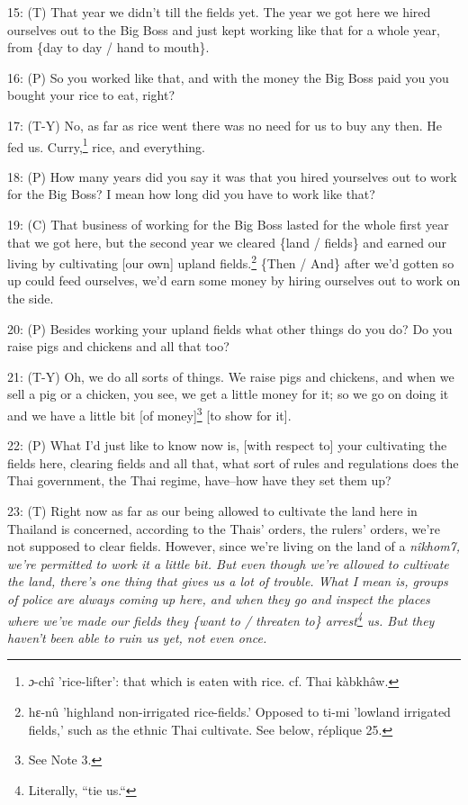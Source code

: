 15: (T) That year we didn't till the fields yet. The year we got here we hired
ourselves out to the Big Boss and just kept working like that for a whole year,
from \{day to day / hand to mouth\}.

16: (P) So you worked like that, and with the money the Big Boss paid you you bought
your rice to eat, right?

17: (T-Y) No, as far as rice went there was no need for us to buy any then. He
fed us. Curry,\footnote{\emph{ɔ}-chî 'rice-lifter': that which is eaten with rice. cf. Thai kàbkhâw.} rice, and everything.

18: (P) How many years did you say it was that you hired yourselves out to work
for the Big Boss? I mean how long did you have to work like that?

19: (C) That business of working for the Big Boss lasted for the whole first year
that we got here, but the second year we cleared \{land / fields\} and earned our
living by cultivating [our own] upland fields.\footnote{hɛ-nû 'highland non-irrigated rice-fields.' Opposed to ti-mi 'lowland irrigated fields,' such as the ethnic Thai cultivate. See below, réplique 25.} \{Then / And\} after we'd gotten
so up could feed ourselves, we'd earn some money by hiring ourselves out to work
on the side.

20: (P) Besides working your upland fields what other things do you do? Do you
raise pigs and chickens and all that too?

21: (T-Y) Oh, we do all sorts of things. We raise pigs and chickens, and when we
sell a pig or a chicken, you see, we get a little money for it; so we go on doing
it and we have a little bit [of money]\footnote{See Note 3.} [to show for it].

22: (P) What I'd just like to know now is, [with respect to] your cultivating the
fields here, clearing fields and all that, what sort of rules and regulations does
the Thai government, the Thai regime, have--how have they set them up?

23: (T) Right now as far as our being allowed to cultivate the land here in Thailand
is concerned, according to the Thais' orders, the rulers' orders, we're not supposed
to clear fields. However, since we're living on the land of a \textit{nîkhom7,
we're permitted to work it a little bit. But even though we're allowed to cultivate
the land, there's one thing that gives us a lot of trouble. What I mean is, groups
of police are always coming up here, and when they go and inspect the places where
we've made our fields they \{want to / threaten to\} arrest\footnote{Literally, ``tie us.``} us. But they haven't
been able to ruin us yet, not even once. }

